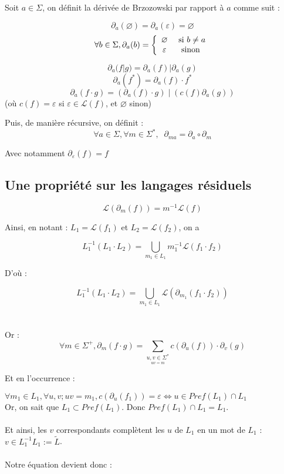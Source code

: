 \documentclass{article}
\begin{document}
Soit $a \in \Sigma$, on définit la dérivée de Brzozowski par rapport à $a$ comme suit :

$$\partial_a(\varnothing) = \partial_a(\varepsilon) = \varnothing$$
$$\forall b \in \Sigma, \partial_a(b) = 
\left \{ \begin{array}{cc}
        \varnothing & \textup{ si } b \ne a \\
        \varepsilon & \textup{ sinon }
        \end{array}
\right.$$

$$\partial_a(f|g) = \partial_a(f) | \partial_a(g)$$
$$\partial_a(f^*) = \partial_a(f)\cdot f^*$$
$$\partial_a(f\cdot g) = (\partial_a(f)\cdot g )\;|\;( c(f)\partial_a(g))$$
(où $c(f) = \varepsilon$ si $\varepsilon \in \mathcal{L}(f)$, et $\varnothing$ sinon) 

Puis, de manière récursive, on définit :
$$\forall a \in \Sigma, \forall m \in \Sigma^*, \;\; \partial_{ma} = \partial_a \circ \partial_m$$

Avec notamment $\partial_\varepsilon (f) = f$

\subsection{Une propriété sur les langages résiduels}
$$\mathcal{L}(\partial_m(f)) = m^{-1}\mathcal{L}(f)$$

Ainsi, en notant : $L_1 = \mathcal{L}(f_1)$ et $L_2 = \mathcal{L}(f_2)$, on a

$$L_1^{-1}(L_1 \cdot L_2) = \bigcup_{m_1 \in L_1}m_1^{-1}\mathcal{L}(f_1\cdot f_2)$$

D'où :

$$\boxed{L_1^{-1}(L_1\cdot L_2) = \bigcup_{m_1 \in L_1}\mathcal{L}(\partial_{m_1}(f_1 \cdot f_2))}$$
\\
\\
Or :
$$\boxed{\forall m \in \Sigma^+, \partial_m(f\cdot g) =  \sum_{\underset{uv = m}{u,v \in \Sigma^*}} c \left (\partial_u(f)\right ) \cdot \partial_v(g) }$$

Et en l'occurrence :

$\forall m_1 \in L_1, \forall u,v ; uv = m_1, c(\partial_u(f_1)) = \varepsilon \Leftrightarrow u \in Pref(L_1)\cap L_1$
\\
Or, on sait que $L_1 \subset Pref(L_1)$. Donc $Pref(L_1) \cap L_1 = L_1$.
\\
\\
Et ainsi, les $v$ correspondants complètent les $u$ de $L_1$ en un mot de $L_1$ : $v \in L_1^{-1}L_1 := \tilde{L}$.
\\
\\
Notre équation devient donc :
\end{document}
